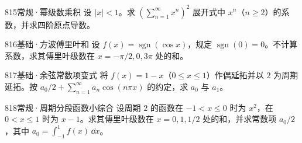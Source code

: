 \begin{exercise}{815}{常规·幂级数乘积}
设 $|x|<1$。求 $(\sum_{n=1}^{\infty}x^n)^2$ 展开式中 $x^n$（$n\geq2$）的系数，并求四阶原点导数。
\end{exercise}
\begin{exercise}{816}{基础·方波傅里叶和}
设 $f(x)=\operatorname{sgn}(\cos x)$，规定 $\operatorname{sgn}(0)=0$。不计算系数，求其傅里叶级数在 $x=-\pi/2,0,3\pi$ 处的和。
\end{exercise}
\begin{exercise}{817}{基础·余弦常数项变式}
将 $f(x)=1-x$（$0\leq x\leq1$）作偶延拓并以 $2$ 为周期延拓。按 $a_0/2+\sum_{n=1}^{\infty}a_n\cos(n\pi x)$ 的约定，求 $a_0$ 与 $a_1$。
\end{exercise}
\begin{exercise}{818}{常规·周期分段函数小综合}
设周期 $2$ 的函数在 $-1<x\leq0$ 时为 $x^2$，在 $0<x\leq1$ 时为 $x-1$。求其傅里叶级数在 $x=0,1,1/2$ 处的和，并求常数项 $a_0/2$，其中 $a_0=\int_{-1}^1f(x)\,\dd x$。
\end{exercise}
